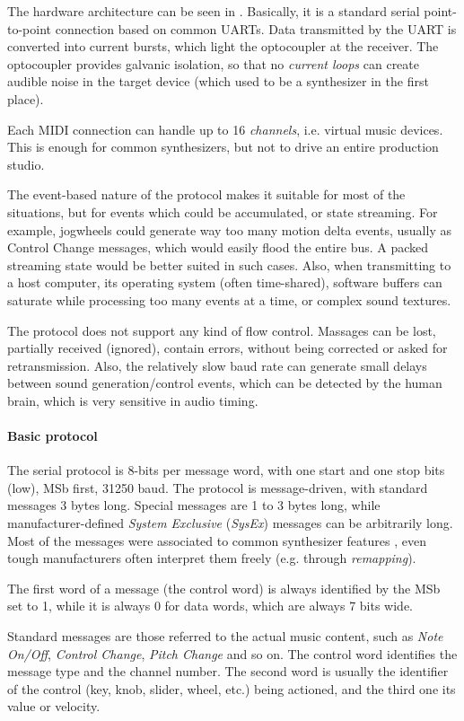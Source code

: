 \documentclass[a4paper,10pt]{article}
\begin{document}
\begin{multicols}{2}
The hardware architecture can be seen in \CITEME. Basically, it is a standard
serial point-to-point connection based on common UARTs. Data transmitted by
the UART is converted into current bursts, which light the optocoupler at the
receiver. The optocoupler provides galvanic isolation, so that no
\emph{current loops} can create audible noise in the target device (which
used to be a synthesizer in the first place).

Each MIDI connection can handle up to 16 \emph{channels}, i.e. virtual music
devices. This is enough for common synthesizers, but not to drive an entire
production studio.

The event-based nature of the protocol makes it suitable for most of the
situations, but for events which could be accumulated, or state streaming.
For example, jogwheels could generate way too many motion delta events, usually
as Control Change messages, which would easily flood the entire bus. A packed
streaming state would be better suited in such cases.
Also, when transmitting to a host computer, its operating system (often
time-shared), software buffers can saturate while processing too many events
at a time, or complex sound textures.

The protocol does not support any kind of flow control. Massages can be lost,
partially received (ignored), contain errors, without being corrected or asked
for retransmission. Also, the relatively slow baud rate can generate small
delays between sound generation/control events, which can be detected by
the human brain, which is very sensitive in audio timing.


\paragraph{Basic protocol}
The serial protocol is 8-bits per message word, with one start and one stop
bits (low), MSb first, 31250 baud. The protocol is message-driven, with
standard messages 3 bytes long. Special messages are 1 to 3 bytes long, while
manufacturer-defined \emph{System Exclusive} (\emph{SysEx}) messages can be
arbitrarily long. Most of the messages were associated to common synthesizer
features \CITEME, even tough manufacturers often interpret them freely
(e.g. through \emph{remapping}).

The first word of a message (the control word) is always identified by the
MSb set to 1, while it is always 0 for data words, which are always 7 bits wide.

Standard messages are those referred to the actual music content, such as
\emph{Note On/Off}, \emph{Control Change}, \emph{Pitch Change} and so on.
The control word identifies the message type and the channel number. The
second word is usually the identifier of the control (key, knob, slider,
wheel, etc.) being actioned, and the third one its value or velocity.


\end{multicols}
\end{document}
